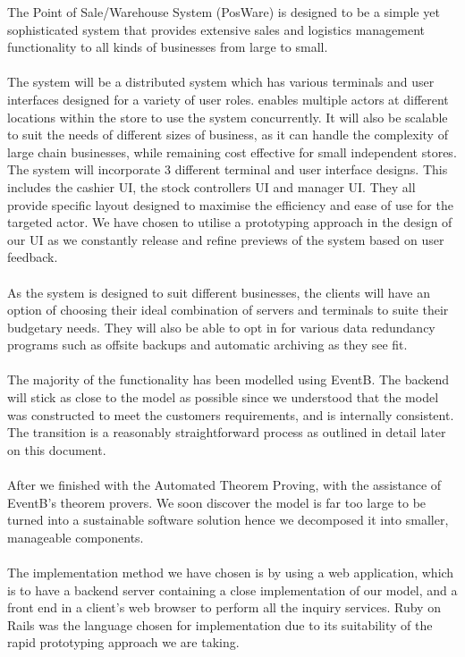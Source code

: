 \documentclass[a4paper]{article}
\begin{document}
The Point of Sale/Warehouse System (PosWare) is designed to be a simple yet sophisticated system that provides extensive sales and logistics management functionality to all kinds of businesses from large to small.
\\\\
The system will be a distributed system which has various terminals and user interfaces designed for a variety of user roles.  enables multiple actors at different locations within the store to use the system concurrently. It will also be scalable to suit the needs of different sizes of business, as it can handle the complexity of large chain businesses, while remaining cost effective for small independent stores. The system will incorporate 3 different terminal and user interface designs. This includes the cashier UI, the stock controllers UI and manager UI. They all provide specific layout designed to maximise the efficiency and ease of use for the targeted actor. We have chosen to utilise a prototyping approach in the design of our UI as we constantly release and refine previews of the system based on user feedback.
\\\\
As the system is designed to suit different businesses, the clients will have an option of
choosing their ideal combination of servers and terminals to suite their budgetary needs. They will also be able to opt in for various data redundancy programs such as offsite backups and automatic archiving as they see fit.
\\\\
The majority  of the functionality  has been modelled using EventB. The backend will stick as close to the model as possible since we understood that  the model was constructed to meet the customers requirements, and is internally consistent. The transition is a reasonably straightforward process as outlined in detail later on this document.
\\\\
After we finished with the Automated Theorem Proving, with the assistance of EventB’s theorem provers. We soon discover the model is far too large to be turned into a sustainable software solution hence we decomposed it into smaller, manageable components. 
\\\\
The implementation method we have chosen is by using a web application, which is to have a backend server containing a close implementation of our model, and a front end in a client’s web browser to perform all the inquiry services. Ruby on Rails was the language chosen for implementation due to its suitability of the rapid prototyping approach we are taking. 
\end{document}
